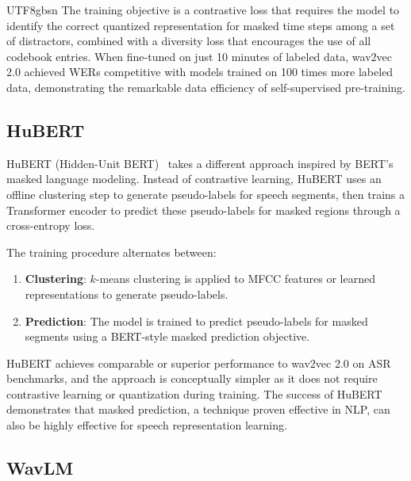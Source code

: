 \documentclass[12pt,a4paper]{article}
\begin{document}
\begin{CJK}{UTF8}{gbsn}
The training objective is a contrastive loss that requires the model to identify the correct quantized representation for masked time steps among a set of distractors, combined with a diversity loss that encourages the use of all codebook entries. When fine-tuned on just 10 minutes of labeled data, wav2vec 2.0 achieved WERs competitive with models trained on 100 times more labeled data, demonstrating the remarkable data efficiency of self-supervised pre-training.

\subsection{HuBERT}
\label{subsec:hubert}

HuBERT (Hidden-Unit BERT)~\cite{hsu2021hubert} takes a different approach inspired by BERT's masked language modeling. Instead of contrastive learning, HuBERT uses an offline clustering step to generate pseudo-labels for speech segments, then trains a Transformer encoder to predict these pseudo-labels for masked regions through a cross-entropy loss.

The training procedure alternates between:
\begin{enumerate}[leftmargin=*]
    \item \textbf{Clustering}: $k$-means clustering is applied to MFCC features or learned representations to generate pseudo-labels.
    \item \textbf{Prediction}: The model is trained to predict pseudo-labels for masked segments using a BERT-style masked prediction objective.
\end{enumerate}

HuBERT achieves comparable or superior performance to wav2vec 2.0 on ASR benchmarks, and the approach is conceptually simpler as it does not require contrastive learning or quantization during training. The success of HuBERT demonstrates that masked prediction, a technique proven effective in NLP, can also be highly effective for speech representation learning.

\subsection{WavLM}
\label{subsec:wavlm}


\end{CJK}
\end{document}

